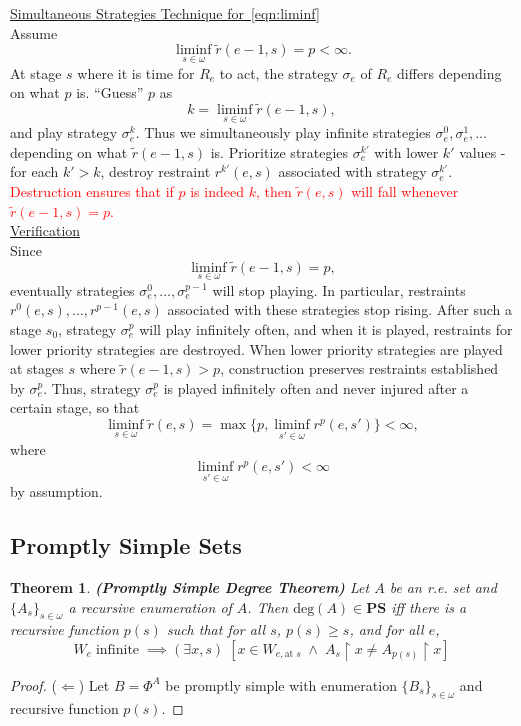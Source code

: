 \documentclass{article}
\newcommand{\COMMENT}[1]{\textcolor{red}{#1}}
\newtheorem{theorem}{Theorem}[subsection]
\begin{document}
  \underline{Simultaneous Strategies Technique for~\eqref{eqn:liminf}}\\
  Assume
  \[\liminf_{s\in\omega} \tilde{r}(e-1,s) =p<\infty.\]
  At stage $s$ where it is time for $R_e$ to act, the strategy $\sigma_e$
  of $R_e$ differs depending on what $p$ is. ``Guess'' $p$
  as
  \[k=\liminf_{s\in\omega} \tilde{r}(e-1,s),\]
  and play strategy $\sigma_e^k$. Thus we simultaneously play 
  infinite strategies $\sigma_e^0,\sigma_e^1,\ldots$ depending on what
  $\tilde{r}(e-1,s)$ is. Prioritize strategies $\sigma_e^{k'}$
  with lower $k'$ values - for each $k'>k$, destroy restraint
  $r^{k'}(e,s)$ associated with strategy $\sigma_e^{k'}$.
  \COMMENT{Destruction ensures that if $p$ is indeed $k$, then
  $\tilde{r}(e,s)$ will fall whenever $\tilde{r}(e-1,s)=p$.}\\

  \underline{Verification}\\
  Since 
  \[\liminf_{s\in\omega} \tilde{r}(e-1,s) =p,\]
  eventually strategies $\sigma_e^0,\ldots,\sigma_e^{p-1}$ will
  stop playing. In particular, restraints
  $r^0(e,s),\ldots,r^{p-1}(e,s)$ associated with these strategies
  stop rising. After such a stage $s_0$, strategy $\sigma_e^{p}$ will
  play infinitely often, and when it is played, restraints for lower
  priority strategies are destroyed. When lower priority strategies are
  played at stages $s$ where $\tilde{r}(e-1,s)>p$, construction
  preserves restraints established by $\sigma_e^{p}$. Thus,
  strategy $\sigma_e^{p}$ is played infinitely often and never
  injured after a certain stage, so that
  \[\liminf_{s\in\omega} \tilde{r}(e,s) =\max\{p,
  \liminf_{s'\in\omega} r^{p}(e,s')\} <\infty,\]
  where
  \[\liminf_{s'\in\omega} r^{p}(e,s') <\infty\]
  by assumption.

\subsection{Promptly Simple Sets}
  \begin{theorem}
    \textbf{(Promptly Simple Degree Theorem)} Let $A$ be an r.e. set and
    $\{A_s\}_{s\in\omega}$ a recursive enumeration of $A$. Then
    $\text{deg}(A) \in\bm{PS}$ iff there is a recursive function $p(s)$ such
    that for all $s$, $p(s)\geq s$, and for all $e$,
    \begin{equation}
      W_e\; \text{infinite}\; \implies (\exists x,s)\; [x\in
      W_{e,\text{at}\; s}\; \wedge\; A_s\restriction x \neq
      A_{p(s)}\restriction x]
      \label{eqn:promptly-permit}
    \end{equation}
  \end{theorem}
  \begin{proof}
    ($\Leftarrow$) Let $B=\Phi^A$ be promptly simple with enumeration
    $\{B_s\}_{s\in\omega}$ and recursive function $p(s)$.
  \end{proof}
\end{document}
